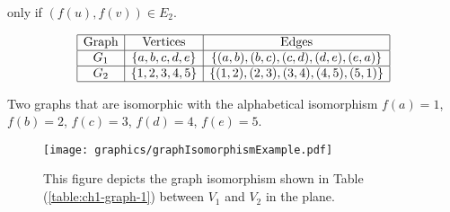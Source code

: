 only 
if $(f(u),f(v)) \in E_2$. 
\begin{table}[!ht]
\begin{center}
$$\begin{array}{|c|c|c|}\hline
\text{Graph}&\text{Vertices}&\text{Edges}\\\hline
G_1&\left\lbrace a,b,c,d,e \right\rbrace & \left\lbrace (a,b),(b,c),(c,d),(d,e),(e,a) \right\rbrace 
\\\hline
G_2&\left\lbrace 1,2,3,4,5 \right\rbrace & \left\lbrace (1,2),(2,3),(3,4),(4,5),(5,1) \right\rbrace 
\\\hline
\end{array} $$
\caption{Two graphs that are isomorphic with the alphabetical isomorphism $f(a)=1$, $f(b)=2$, $f(c) 
= 3$, $f(d)=4$, $f(e)=5$.}
\end{center} 
\label{table:ch1-graph-1}
\end{table}

\begin{figure}[!h]
\begin{center}
\texttt{[image: graphics/graphIsomorphismExample.pdf]}
\end{center} 
\caption{This figure depicts the graph isomorphism shown in Table 
(\ref{table:ch1-graph-1}) between 
$V_1$ and $V_2$ in the plane.}
\label{fig:configuration-3}
\end{figure}


